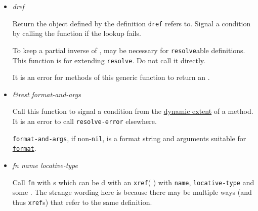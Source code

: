 \begin{itemize}
\item
  \label{x-28DREF-EXT-3ARESOLVE-2A-20GENERIC-FUNCTION-29}
  \emph{dref}

  Return the object defined by the definition \texttt{dref} refers to.
  Signal a
  condition by calling the
  function if the lookup fails.

  To keep  a
  partial inverse of
  ,
  may be necessary for \texttt{resolve}able definitions. This function
  is for extending \texttt{resolve}. Do not call it directly.

  It is an error for methods of this generic function to return an
  .
\item
  \label{x-28DREF-EXT-3ARESOLVE-ERROR-20FUNCTION-29}
  \emph{\&rest format-and-args}

  Call this function to signal a
  condition from the
  \href{http://www.lispworks.com/documentation/HyperSpec/Body/26_glo_d.htm\#dynamic_extent}{dynamic
  extent} of a
  method. It is an error to call \texttt{resolve-error} elsewhere.

  \texttt{format-and-args}, if non-\texttt{nil}, is a format string and
  arguments suitable for
  \href{http://www.lispworks.com/documentation/HyperSpec/Body/f_format.htm}{\texttt{format}}.
\item
  \label{x-28DREF-EXT-3AMAP-DEFINITIONS-OF-NAME-20GENERIC-FUNCTION-29}
  \emph{fn name locative-type}

  Call \texttt{fn} with
  s which can be
  d with an
  \texttt{xref}(
  ) with
  \texttt{name}, \texttt{locative-type} and some
  .
  The strange wording here is because there may be multiple ways (and
  thus \texttt{xref}s) that refer to the same definition.


\end{itemize}
